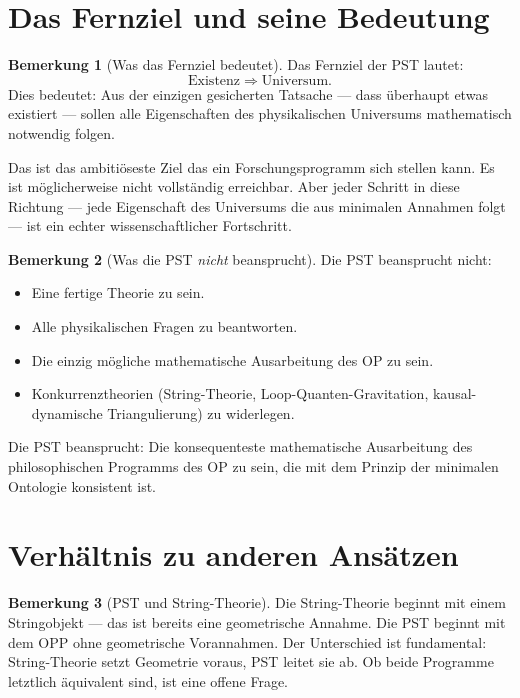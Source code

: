 \documentclass[11pt,a4paper]{article}
\theoremstyle{plain}
\theoremstyle{definition}
\newtheorem{remark}{Bemerkung}[section]
\begin{document}
\section{Das Fernziel und seine Bedeutung}

\begin{remark}[Was das Fernziel bedeutet]
Das Fernziel der PST lautet:
\[
  \text{Existenz} \;\Longrightarrow\; \text{Universum.}
\]
Dies bedeutet: Aus der einzigen gesicherten Tatsache --- dass
\"{u}berhaupt etwas existiert --- sollen alle Eigenschaften des
physikalischen Universums mathematisch notwendig folgen.

Das ist das ambiti\"{o}seste Ziel das ein Forschungsprogramm sich stellen
kann. Es ist m\"{o}glicherweise nicht vollst\"{a}ndig erreichbar. Aber
jeder Schritt in diese Richtung --- jede Eigenschaft des Universums die
aus minimalen Annahmen folgt --- ist ein echter wissenschaftlicher
Fortschritt.
\end{remark}

\begin{remark}[Was die PST \emph{nicht} beansprucht]
Die PST beansprucht nicht:
\begin{itemize}
  \item Eine fertige Theorie zu sein.
  \item Alle physikalischen Fragen zu beantworten.
  \item Die einzig m\"{o}gliche mathematische Ausarbeitung des OP zu sein.
  \item Konkurrenztheorien (String-Theorie, Loop-Quanten-Gravitation,
        kausal-dynamische Triangulierung) zu widerlegen.
\end{itemize}
Die PST beansprucht: Die konsequenteste mathematische Ausarbeitung des
philosophischen Programms des OP zu sein, die mit dem Prinzip der
minimalen Ontologie konsistent ist.
\end{remark}

\section{Verh\"{a}ltnis zu anderen Ans\"{a}tzen}

\begin{remark}[PST und String-Theorie]
Die String-Theorie beginnt mit einem Stringobjekt --- das ist bereits
eine geometrische Annahme. Die PST beginnt mit dem OPP ohne geometrische
Vorannahmen. Der Unterschied ist fundamental: String-Theorie setzt
Geometrie voraus, PST leitet sie ab. Ob beide Programme letztlich
\"{a}quivalent sind, ist eine offene Frage.
\end{remark}
\end{document}
